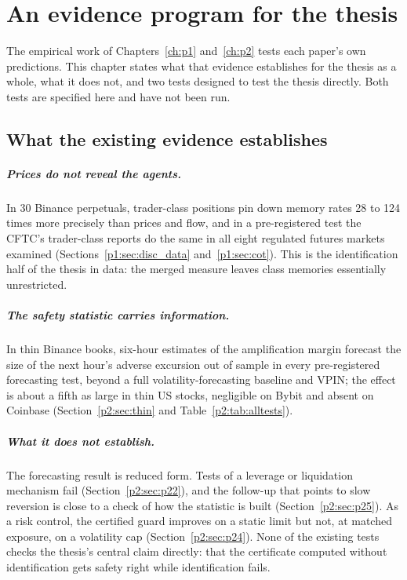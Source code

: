 \chapter{An evidence program for the thesis}\label{ch:evidence}

The empirical work of Chapters~\ref{ch:p1} and~\ref{ch:p2} tests each paper's own predictions. This chapter states what that evidence establishes for the thesis as a whole, what it does not, and two tests designed to test the thesis directly. Both tests are specified here and have not been run.

\section{What the existing evidence establishes}\label{sec:ev_existing}

\paragraph{Prices do not reveal the agents.} In 30 Binance perpetuals, trader-class positions pin down memory rates 28 to 124 times more precisely than prices and flow, and in a pre-registered test the CFTC's trader-class reports do the same in all eight regulated futures markets examined (Sections~\ref{p1:sec:disc_data} and~\ref{p1:sec:cot}). This is the identification half of the thesis in data: the merged measure leaves class memories essentially unrestricted.

\paragraph{The safety statistic carries information.} In thin Binance books, six-hour estimates of the amplification margin forecast the size of the next hour's adverse excursion out of sample in every pre-registered forecasting test, beyond a full volatility-forecasting baseline and VPIN; the effect is about a fifth as large in thin US stocks, negligible on Bybit and absent on Coinbase (Section~\ref{p2:sec:thin} and Table~\ref{p2:tab:alltests}).

\paragraph{What it does not establish.} The forecasting result is reduced form. Tests of a leverage or liquidation mechanism fail (Section~\ref{p2:sec:p22}), and the follow-up that points to slow reversion is close to a check of how the statistic is built (Section~\ref{p2:sec:p25}). As a risk control, the certified guard improves on a static limit but not, at matched exposure, on a volatility cap (Section~\ref{p2:sec:p24}). None of the existing tests checks the thesis's central claim directly: that the certificate computed without identification gets safety right while identification fails.

